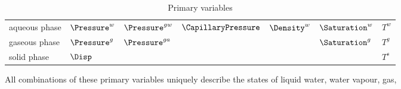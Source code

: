 \begin{table}[htb!]
\caption{Primary variables}
\label{tab:}
\begin{center}
\begin{tabular}{|l||l|l|l|l|l||l|}
\hline
aqueous phase   & $\Pressure^w$ & $\Pressure^{gw}$  & $\CapillaryPressure$ & $\Density^w$ & $\Saturation^w$ & $T^w$ \\
gaseous phase   & $\Pressure^g$ & $\Pressure^{ga}$  &                      &              & $\Saturation^g$ & $T^g$ \\
solid   phase   & $\Disp$       &                   &                      &              &    & $T^s$\\
\hline
\end{tabular}
\end{center}
\end{table}
%

All combinations of these primary variables
uniquely describe the states of liquid water, water vapour, gas,
